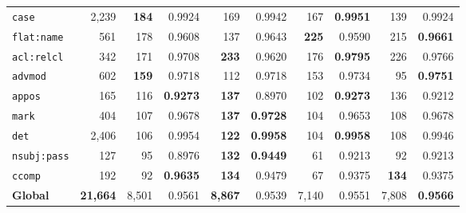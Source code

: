 \begin{table}[p]
\begin{tabular}{l r| r r| r r| r r| r r}
  \texttt{case} & 2,239 & \textbf{184} & 0.9924 & 169 & 0.9942 & 167 & \textbf{0.9951} & 139 & 0.9924 \\
  \texttt{flat\!:\!name} & 561 & 178 & 0.9608 & 137 & 0.9643 & \textbf{225} & 0.9590 & 215 & \textbf{0.9661} \\
  \texttt{acl\!:\!relcl} & 342 & 171 & 0.9708 & \textbf{233} & 0.9620 & 176 & \textbf{0.9795} & 226 & 0.9766 \\
  \texttt{advmod} & 602 & \textbf{159} & 0.9718 & 112 & 0.9718 & 153 & 0.9734 & 95 & \textbf{0.9751} \\
  \texttt{appos} & 165 & 116 & \textbf{0.9273} & \textbf{137} & 0.8970 & 102 & \textbf{0.9273} & 136 & 0.9212 \\
  \texttt{mark} & 404 & 107 & 0.9678 & \textbf{137} & \textbf{0.9728} & 104 & 0.9653 & 108 & 0.9678 \\
  \texttt{det} & 2,406 & 106 & 0.9954 & \textbf{122} & \textbf{0.9958} & 104 & \textbf{0.9958} & 108 & 0.9946 \\
  \texttt{nsubj\!:\!pass} & 127 & 95 & 0.8976 & \textbf{132} & \textbf{0.9449} & 61 & 0.9213 & 92 & 0.9213 \\
  \texttt{ccomp} & 192 & 92 & \textbf{0.9635} & \textbf{134} & 0.9479 & 67 & 0.9375 & \textbf{134} & 0.9375 \\
\midrule
  \textbf{Global} & \textbf{21,664} & 8,501 & 0.9561 & \textbf{8,867} & 0.9539 & 7,140 & 0.9551 & 7,808 & \textbf{0.9566} \\
\bottomrule
\end{tabular}
\endgroup
\instablegendaFull
\end{table}

